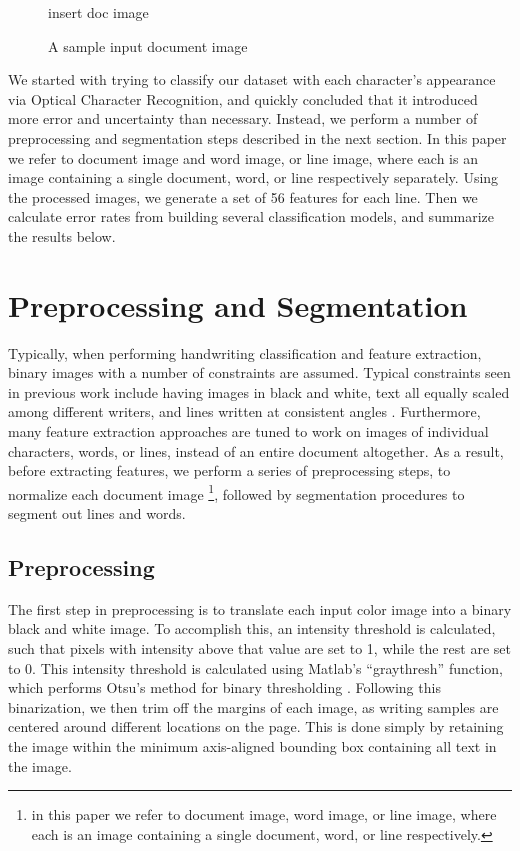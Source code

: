 \documentclass[paper=a4, fontsize=11pt]{scrartcl} %
\numberwithin{equation}{section} %
\numberwithin{figure}{section} %
\numberwithin{table}{section} %
\begin{document}
\begin{figure}
\label{fig:docImage}
insert doc image
\caption{A sample input document image}
\end{figure}

We started with trying to classify our dataset with each character’s
appearance via Optical Character Recognition, and quickly concluded
that it introduced more error and uncertainty than necessary. Instead,
we perform a number of preprocessing and segmentation steps described
in the next section. In this paper we refer to document image and word
image, or line image, where each is an image containing a single
document, word, or line respectively separately. Using the processed
images, we generate a set of 56 features for each line. Then we
calculate error rates from building several classification models, and
summarize the results below.

\section{Preprocessing and Segmentation}
\label{sec:pands}
Typically, when performing handwriting classification and feature
extraction, binary images with a number of constraints are
assumed. Typical constraints seen in previous work include having
images in black and white, text all equally scaled among different
writers, and lines written at consistent angles
\cite{Preprocessing}. Furthermore, many feature extraction approaches
are tuned to work on images of individual characters, words, or lines,
instead of an entire document altogether. As a result, before
extracting features, we perform a series of preprocessing steps, to
normalize each document image \footnote{in this paper we refer to
document image, word image, or line image, where each is an image
containing a single document, word, or line respectively.}, followed
by segmentation procedures to segment out lines and words.

\subsection{Preprocessing}
The first step in preprocessing is to translate each input color image
into a binary black and white image. To accomplish this, an intensity
threshold is calculated, such that pixels with intensity above that
value are set to 1, while the rest are set to 0. This intensity
threshold is calculated using Matlab’s “graythresh” function, which
performs Otsu’s method for binary thresholding
\cite{ThresholdSelection}. Following this binarization, we then trim
off the margins of each image, as writing samples are centered around
different locations on the page. This is done simply by retaining the
image within the minimum axis-aligned bounding box containing all text
in the image.
\end{document}
